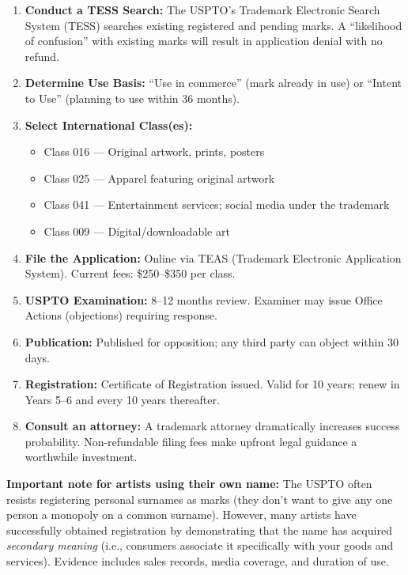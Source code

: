 \documentclass[11pt,letterpaper]{article}
\begin{document}
\begin{enumerate}[leftmargin=2em]
  \item \textbf{Conduct a TESS Search:} The USPTO's Trademark Electronic Search System (TESS) searches existing registered and pending marks. A ``likelihood of confusion'' with existing marks will result in application denial with no refund.
  \item \textbf{Determine Use Basis:} ``Use in commerce'' (mark already in use) or ``Intent to Use'' (planning to use within 36 months).
  \item \textbf{Select International Class(es):}
    \begin{itemize}[noitemsep]
      \item Class 016 --- Original artwork, prints, posters
      \item Class 025 --- Apparel featuring original artwork
      \item Class 041 --- Entertainment services; social media under the trademark
      \item Class 009 --- Digital/downloadable art
    \end{itemize}
  \item \textbf{File the Application:} Online via TEAS (Trademark Electronic Application System). Current fees: \$250--\$350 per class.
  \item \textbf{USPTO Examination:} 8--12 months review. Examiner may issue Office Actions (objections) requiring response.
  \item \textbf{Publication:} Published for opposition; any third party can object within 30 days.
  \item \textbf{Registration:} Certificate of Registration issued. Valid for 10 years; renew in Years 5--6 and every 10 years thereafter.
  \item \textbf{Consult an attorney:} A trademark attorney dramatically increases success probability. Non-refundable filing fees make upfront legal guidance a worthwhile investment.
\end{enumerate}

\textbf{Important note for artists using their own name:} The USPTO often resists registering personal surnames as marks (they don't want to give any one person a monopoly on a common surname). However, many artists have successfully obtained registration by demonstrating that the name has acquired \emph{secondary meaning} (i.e., consumers associate it specifically with your goods and services). Evidence includes sales records, media coverage, and duration of use.
\end{document}
